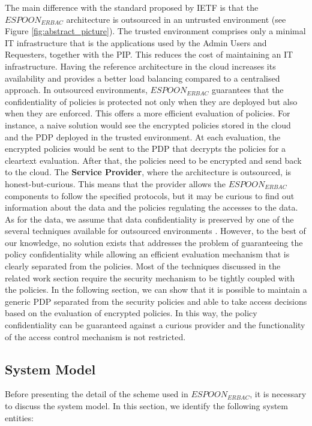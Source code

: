 \documentclass[final,5p,times,twocolumn]{elsarticle}
\begin{document}
The main difference with the standard proposed by IETF is that the $\mathit{ESPOON_{ERBAC}}$ architecture is outsourced in an untrusted environment (see Figure \ref{fig:abstract_picture}). The trusted environment comprises only a minimal IT infrastructure that is the applications used by the Admin Users and Requesters, together with the PIP. This reduces the cost of maintaining an IT infrastructure. Having the reference architecture in the cloud increases its availability and provides a better load balancing compared to a centralised approach. In outsourced environments, $\mathit{ESPOON_{ERBAC}}$ guarantees that the confidentiality of policies is protected not only when they are deployed but also when they are enforced. This offers a more efficient evaluation of policies. For instance, a naive solution would see the encrypted policies stored in the cloud and the PDP deployed in the trusted environment. At each evaluation, the encrypted policies would be sent to the PDP that decrypts the policies for a cleartext evaluation. After that, the policies need to be encrypted and send back to the cloud. The \textbf{Service Provider}, where the architecture is outsourced, is honest-but-curious. This means that the provider allows the $\mathit{ESPOON_{ERBAC}}$ components to follow the specified protocols, but it may be curious to find out information about the data and the policies regulating the accesses to the data. As for the data, we assume that data confidentiality is preserved by one of the several techniques available for outsourced environments \cite{Dong2011, Rhee2010, Shao2010}. However, to the best of our knowledge, no solution exists that addresses the problem of guaranteeing the policy confidentiality while allowing an efficient evaluation mechanism that is clearly separated from the policies. Most of the techniques discussed in the related work section require the security mechanism to be tightly coupled with the policies. In the following section, we can show that it is possible to maintain a generic PDP separated from the security policies and able to take access decisions based on the evaluation of encrypted policies. In this way, the policy confidentiality can be guaranteed against a curious provider and the functionality of the access control mechanism is not restricted.


\subsection{System Model}
Before presenting the detail of the scheme used in $\mathit{ESPOON_{ERBAC}}$, it is necessary to discuss the system model. In this section, we identify the following system entities:
\end{document}

